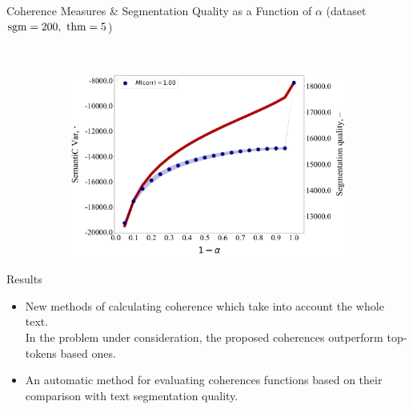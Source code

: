 \documentclass[russian]{beamer}
\begin{document}
\begin{frame}{Coherence Measures \& Segmentation Quality as a Function of $\alpha$ (dataset $\sgm=200,\ \thm=5$)}
\begin{figure}[h]
\begin{subfigure}[t]{0.48\textwidth}
    \end{subfigure}
    ~
    \begin{subfigure}[t]{0.48\textwidth}
      \includegraphics[width=\linewidth]{semantic_var-iteration.jpg}
    \end{subfigure}
  \end{figure}
\end{frame}

\begin{frame}{Results}
  \begin{itemize}
  \setlength\itemsep{0.5cm}
  \item
    New methods of calculating coherence which take into account the whole text.\\
    In the problem under consideration, the proposed coherences outperform top-tokens based ones.
  \item
    An automatic method for evaluating coherences functions based on their comparison with text segmentation quality.
  \end{itemize}
\end{frame}
\end{document}

